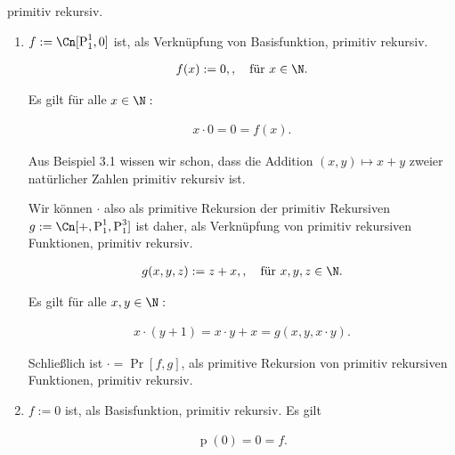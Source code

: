 \begin{exercise}
\begin{enumerate}[label = (\alph*)]
    primitiv rekursiv.

\end{enumerate}

\end{exercise}


\begin{solution}

\phantom{}

\begin{enumerate}[label = (\alph*)]

    \item $f := \Cn[\operatorname P_1^1, 0]$ ist, als Verknüpfung von Basisfunktion, primitiv rekursiv.

    \begin{align*}
        f(x) := 0,, \quad \text{für}~ x \in \N.
    \end{align*}

    Es gilt für alle $x \in \N:$

    \begin{align*}
        x \cdot 0 = 0 = f(x).
    \end{align*}

    Aus Beispiel 3.1 wissen wir schon, dass die Addition $(x, y) \mapsto x + y$ zweier natürlicher Zahlen primitiv rekursiv ist.

    Wir können $\cdot$ also als primitive Rekursion der primitiv Rekursiven
    $g := \Cn[+, \operatorname P_1^1, \operatorname P_1^3]$ ist daher, als Verknüpfung von primitiv rekursiven Funktionen, primitiv rekursiv.

    \begin{align*}
        g(x, y, z) := z + x,, \quad \text{für}~ x, y, z \in \N.
    \end{align*}

    Es gilt für alle $x, y \in \N:$
    
    \begin{align*}
        x \cdot (y + 1) = x \cdot y + x = g(x, y, x \cdot y).
    \end{align*}

    Schließlich ist $\cdot = \Pr[f, g]$, als primitive Rekursion von primitiv rekursiven Funktionen, primitiv rekursiv.

    \item $f := 0$ ist, als Basisfunktion, primitiv rekursiv.
    Es gilt

    \begin{align*}
        \operatorname p(0) = 0 = f.
    \end{align*}


\end{enumerate}
\end{solution}

